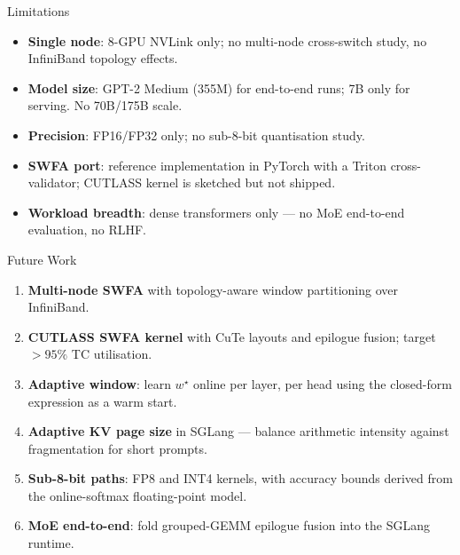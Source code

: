 \documentclass[10pt,aspectratio=169]{beamer}
\begin{document}
\begin{frame}{Limitations}
  \begin{itemize}
    \item \textbf{Single node}: 8-GPU NVLink only; no multi-node
          cross-switch study, no InfiniBand topology effects.
    \item \textbf{Model size}: GPT-2 Medium (355M) for end-to-end
          runs; 7B only for serving. No 70B/175B scale.
    \item \textbf{Precision}: FP16/FP32 only; no sub-8-bit
          quantisation study.
    \item \textbf{SWFA port}: reference implementation in PyTorch
          with a Triton cross-validator; CUTLASS kernel is sketched
          but not shipped.
    \item \textbf{Workload breadth}: dense transformers only — no
          MoE end-to-end evaluation, no RLHF.
  \end{itemize}
\end{frame}

\begin{frame}{Future Work}
  \begin{enumerate}
    \item \textbf{Multi-node SWFA} with topology-aware window
          partitioning over InfiniBand.
    \item \textbf{CUTLASS SWFA kernel} with CuTe layouts and
          epilogue fusion; target $>95\%$ TC utilisation.
    \item \textbf{Adaptive window}: learn $w^\star$ online per layer,
          per head using the closed-form expression as a warm start.
    \item \textbf{Adaptive KV page size} in SGLang — balance arithmetic
          intensity against fragmentation for short prompts.
    \item \textbf{Sub-8-bit paths}: FP8 and INT4 kernels, with
          accuracy bounds derived from the online-softmax
          floating-point model.
    \item \textbf{MoE end-to-end}: fold grouped-GEMM epilogue fusion
          into the SGLang runtime.
  \end{enumerate}
\end{frame}
\end{document}
